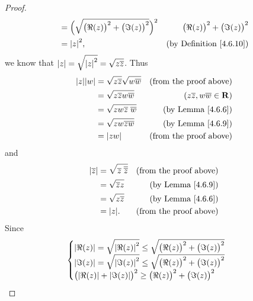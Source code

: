\begin{proof}
\begin{align*}
                       & = \Big(\sqrt{\big(\Re(z)\big)^2 + \big(\Im(z)\big)^2}\Big)^2                                    & \big(\Re(z)\big)^2 + \big(\Im(z)\big)^2 \\
                       & = \abs*{z}^2,                                                                                   & \text{(by Definition \ref{4.6.10})}
    \end{align*}
    we know that \(\abs*{z} = \sqrt{\abs*{z}^2} = \sqrt{z \overline{z}}\).
    Thus
    \begin{align*}
        \abs*{z} \abs*{w} & = \sqrt{z \overline{z}} \sqrt{w \overline{w}} & \text{(from the proof above)}                   \\
                          & = \sqrt{z \overline{z} w \overline{w}}        & (z \overline{z}, w \overline{w} \in \mathbf{R}) \\
                          & = \sqrt{zw \overline{z} \; \overline{w}}      & \text{(by Lemma \ref{4.6.6})}                   \\
                          & = \sqrt{zw \overline{zw}}                     & \text{(by Lemma \ref{4.6.9})}                   \\
                          & = \abs*{zw}                                   & \text{(from the proof above)}
    \end{align*}
    and
    \begin{align*}
        \abs*{\overline{z}} & = \sqrt{\overline{z} \; \overline{\overline{z}}} & \text{(from the proof above)} \\
                            & = \sqrt{\overline{z} z}                          & \text{(by Lemma \ref{4.6.9})} \\
                            & = \sqrt{z \overline{z}}                          & \text{(by Lemma \ref{4.6.6})} \\
                            & = \abs*{z}.                                      & \text{(from the proof above)}
    \end{align*}
    Since
    \begin{align*}
                 & \begin{cases}
            \abs*{\Re(z)} = \sqrt{\abs*{\Re(z)}^2} \leq \sqrt{\big(\Re(z)\big)^2 + \big(\Im(z)\big)^2} \\
            \abs*{\Im(z)} = \sqrt{\abs*{\Im(z)}^2} \leq \sqrt{\big(\Re(z)\big)^2 + \big(\Im(z)\big)^2} \\
            \big(\abs*{\Re(z)} + \abs*{\Im(z)}\big)^2 \geq \big(\Re(z)\big)^2 + \big(\Im(z)\big)^2

\end{cases}
\end{align*}
\end{proof}
